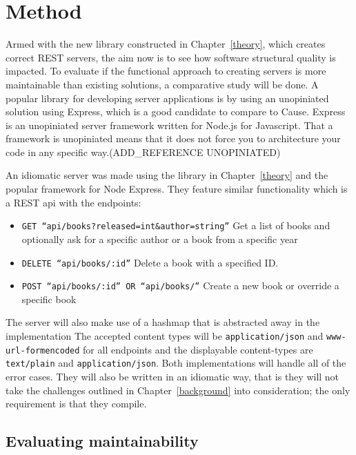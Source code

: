 \chapter{Method}\label{method}

Armed with the new library constructed in Chapter~\ref{theory}, which creates
correct REST servers, the aim now is to see how software structural quality is
impacted.  To evaluate if the functional approach to creating servers is more
maintainable than existing solutions, a comparative study will be done.  A
popular library for developing server applications is by using an unopiniated
solution using Express, which is a good candidate to compare to Cause. Express
is an unopiniated server framework written for Node.js for Javascript.  That a
framework is unopiniated means that it does not force you to architecture your
code in any specific way.(ADD\_REFERENCE UNOPINIATED)

An idiomatic server was made using the library in Chapter~\ref{theory} and the
popular framework for Node Express. They feature similar functionality which is
a REST api with the endpoints:

\begin{itemize}
    \item \texttt{GET ``api/books?released=int\&author=string''} Get a list of
    books and optionally ask for a specific author or a book from a specific
    year
    \item \texttt{DELETE ``api/books/:id''} Delete a book with a specified ID.
    \item \texttt{POST ``api/books/:id'' OR ``api/books/''} Create a new book or
    override a specific book
\end{itemize}

The server will also make use of a hashmap that is abstracted away in the
implementation The accepted content types will be \texttt{application/json} and
\texttt{www-url-formencoded} for all endpoints and the displayable content-types
are \texttt{text/plain} and \texttt{application/json}. Both implementations will
handle all of the error cases. They will also be written in an idiomatic way,
that is they will not take the challenges outlined in Chapter~\ref{background}
into consideration; the only requirement is that they compile.

\section{Evaluating maintainability}\label{evaluatingmaintainability}

